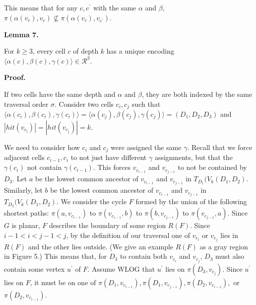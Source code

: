 \documentclass[10pt,a4paper]{article}
\begin{document}
\par
\par
This means that for any $c,c^{\prime}$ with the same $\alpha$ and $\beta$, $\pi(\alpha(v_{c}),v_{c})\not\subseteq\pi(\alpha(v_{c}),v_{c^{\prime}})$.
\par
\par
\par\medskip\noindent\textbf{Lemma 7.}\par
For $k\geq 3$, every cell $c$ of depth $k$ has a unique encoding $\langle\alpha(c),\beta(c),\gamma(c)\rangle\in\mathcal{R}^{3}$.
\par
\par
\par
\par\medskip\noindent\textbf{Proof.}\par
If two cells have the same depth and $\alpha$ and $\beta$, they are both indexed by the same traversal order $\sigma$. Consider two cells $c_{i},c_{j}$ such that $\langle\alpha(c_{i}),\beta(c_{i}),\gamma(c_{i})\rangle=\langle\alpha(c_{j}),%
\beta(c_{j}),\gamma(c_{j})\rangle=(D_{1},D_{2},D_{3})$ and $|\mathit{hit}(v_{c_{i}})|=|\mathit{hit}(v_{c_{j}})|=k$.
\par
\par
We need to consider how $c_{i}$ and $c_{j}$ were assigned the same $\gamma$. Recall that we force adjacent cells $c_{i-1},c_{i}$ to not just have different $\gamma$ assignments, but that the $\gamma(c_{i})$ not contain $\gamma(c_{i-1})$. This forces $v_{c_{i-1}}$ and $v_{c_{j-1}}$ to not be contained by $D_{3}$. Let $a$ be the lowest common ancestor of $v_{c_{i-1}}$ and $v_{c_{j-1}}$ in $T_{D_{1}}(V_{k}(D_{1},D_{2})$. Similarly, let $b$ be the lowest common ancestor of $v_{c_{i-1}}$ and $v_{c_{j-1}}$ in $T_{D_{2}}(V_{k}(D_{1},D_{2})$. We consider the cycle $F$ formed by the union of the following shortest paths: $\pi(a,v_{c_{i-1}})$ to $\pi(v_{c_{i-1}},b)$ to $\pi(b,v_{c_{j-1}})$ to $\pi(v_{c_{j-1}},a)$. Since $G$ is planar, $F$ describes the boundary of some region $R(F)$. Since $i-1<i<j-1<j$, by the definition of our traversal one of $v_{c_{i}}$ or $v_{c_{j}}$ lies in $R(F)$ and the other lies outside. (We give an example $R(F)$ as a gray region in Figure 5.) This means that, for $D_{3}$ to contain both $v_{c_{i}}$ and $v_{c_{j}}$, $D_{3}$ must also contain some vertex $u^{\prime}$ of $F$. Assume WLOG that $u^{\prime}$ lies on $\pi(D_{3},v_{c_{j}})$. Since $u^{\prime}$ lies on $F$, it must be on one of $\pi(D_{1},v_{c_{i-1}}),\pi(D_{1},v_{c_{j-1}}),\pi(D_{2},v_{c_{i-1}}),$ or $\pi(D_{2},v_{c_{i-1}})$.
\end{document}
